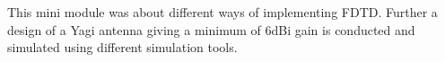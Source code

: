 This mini module was about different ways of implementing FDTD. Further a design of a Yagi antenna giving a minimum of 6dBi gain is conducted and simulated using different simulation tools.   
